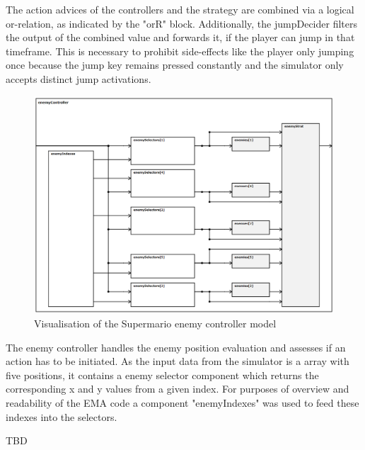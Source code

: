 The action advices of the controllers and the strategy are combined via a logical or-relation, as indicated by the "orR" block. Additionally, the jumpDecider filters the output of the combined value and forwards it, if the player can jump in that timeframe. This is necessary to prohibit side-effects like the player only jumping once because the jump key remains pressed constantly and the simulator only accepts distinct jump activations.

\begin{figure}
	\centering
	\includegraphics[scale=0.4]{pictures/haller_enemycontroller.PNG}
	\caption{Visualisation of the Supermario enemy controller model}
	\label{fig:marioEnemyController}
\end{figure}

The enemy controller handles the enemy position evaluation and assesses if an action has to be initiated. As the input data from the simulator is a array with five positions, it contains a enemy selector component which returns the corresponding x and y values from a given index. For purposes of overview and readability of the EMA code a component "enemyIndexes" was used to feed these indexes into the selectors.

TBD


